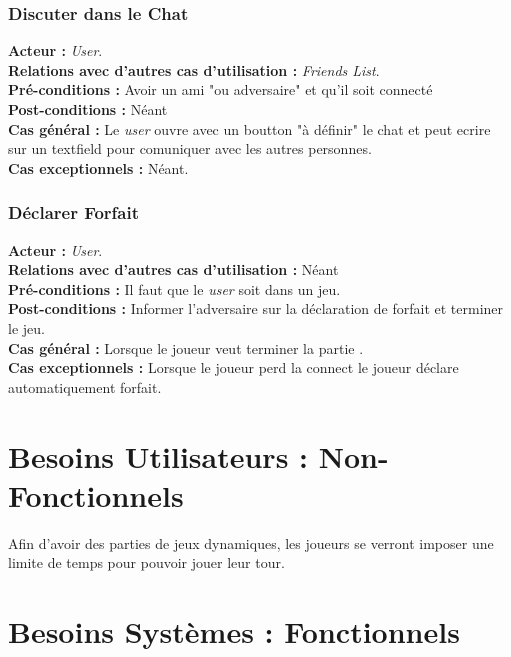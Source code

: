 \documentclass[10pt, a4paper]{article}
\begin{document}
\subsubsection{Discuter dans le Chat}
\textbf{Acteur :} \textit{User}.\\
\textbf{Relations avec d'autres cas d'utilisation :} \textit{Friends List}.\\
\textbf{Pré-conditions :} Avoir un ami "ou adversaire" et qu'il soit connecté\\ %
\textbf{Post-conditions :} Néant\\
\textbf{Cas général :} Le \textit{user} ouvre avec un boutton "à définir" le chat et peut ecrire sur un textfield pour comuniquer avec les autres personnes.\\ %
\textbf{Cas exceptionnels :} Néant.

\subsubsection{Déclarer Forfait}
\textbf{Acteur :} \textit{User}.\\
\textbf{Relations avec d'autres cas d'utilisation :} Néant\\
\textbf{Pré-conditions :} Il faut que le \textit{user} soit dans un jeu. \\
\textbf{Post-conditions :} Informer l'adversaire sur la déclaration de forfait et terminer le jeu.\\
\textbf{Cas général :} Lorsque le joueur veut terminer la partie .\\
\textbf{Cas exceptionnels :} Lorsque le joueur perd la connect le joueur déclare automatiquement forfait. %

\section{Besoins Utilisateurs : Non-Fonctionnels}
Afin d'avoir des parties de jeux dynamiques, les joueurs se verront imposer une limite de temps pour pouvoir jouer leur tour. \\
		
\section{Besoins Systèmes : Fonctionnels}
\end{document}
